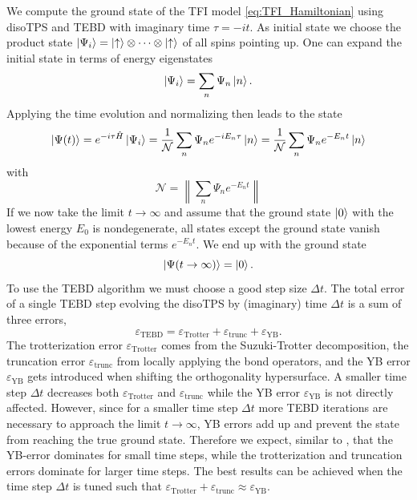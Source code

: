 We compute the ground state of the TFI model \eqref{eq:TFI_Hamiltonian} using disoTPS and TEBD with imaginary time $\tau = -i t$. As initial state we choose the product state $\ket{\Psi_i}=\ket{\uparrow}\otimes\cdots\otimes\ket{\uparrow}$ of all spins pointing up. One can expand the initial state in terms of energy eigenstates
\begin{equation}
	\ket{\Psi_i} = \sum_{n} \Psi_n \ket{n}.
\end{equation}
Applying the time evolution and normalizing then leads to the state
\begin{equation}
	\ket{\Psi(t)} = e^{-i\tau\hat{H}} \ket{\Psi_i} = \frac{1}{\mathcal{N}} \sum_{n} \Psi_n e^{-iE_n\tau} \ket{n} = \frac{1}{\mathcal{N}} \sum_{n} \Psi_n e^{-E_nt} \ket{n}
\end{equation}
with
\begin{equation}
	\mathcal{N} = \left\lVert\sum_{n} \Psi_n e^{-E_nt}\right\rVert
\end{equation}
If we now take the limit $t \rightarrow \infty$ and assume that the ground state $\ket{0}$ with the lowest energy $E_0$ is nondegenerate, all states except the ground state vanish because of the exponential terms $e^{-E_nt}$. We end up with the ground state
\begin{equation}
	\ket{\Psi(t\rightarrow\infty)} = \ket{0}.
\end{equation}
To use the TEBD algorithm we must choose a good step size $\Delta t$. The total error of a single TEBD step evolving the disoTPS by (imaginary) time $\Delta t$ is a sum of three errors,
\begin{equation}
	\varepsilon_\text{TEBD} = \varepsilon_\text{Trotter} + \varepsilon_\text{trunc} + \varepsilon_{\text{YB}}.
\end{equation} 
The trotterization error $\varepsilon_\text{Trotter}$ comes from the Suzuki-Trotter decomposition, the truncation error $\varepsilon_\text{trunc}$ from locally applying the bond operators, and the YB error $\varepsilon_{\text{YB}}$ gets introduced when shifting the orthogonality hypersurface. A smaller time step $\Delta t$ decreases both $\varepsilon_\text{Trotter}$ and $\varepsilon_\text{trunc}$ while the YB error $\varepsilon_{\text{YB}}$ is not directly affected. However, since for a smaller time step $\Delta t$ more TEBD iterations are necessary to approach the limit $t\rightarrow\infty$, YB errors add up and prevent the state from reaching the true ground state. Therefore we expect, similar to \cite{cite:isometric_tensor_network_states_in_two_dimensions, cite:efficient_simulation_of_dynamics_in_two_dimensional_quantum_spin_systems}, that the YB-error dominates for small time steps, while the trotterization and truncation errors dominate for larger time steps. The best results can be achieved when the time step $\Delta t$ is tuned such that $\varepsilon_\text{Trotter} + \varepsilon_\text{trunc} \approx \varepsilon_{\text{YB}}$. \par
